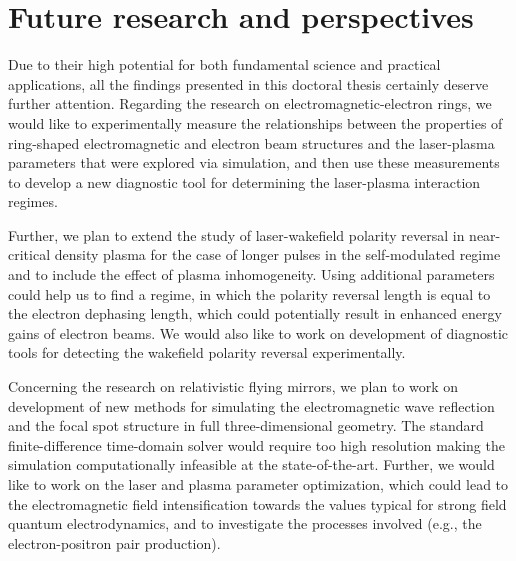 \documentclass[10pt, a4paper, twoside, openright]{report}
\newcommand{\q}[1]{``#1''} %
\begin{document}
\section{Future research and perspectives}

Due to their high potential for both fundamental science and practical applications, all the findings presented in this doctoral thesis certainly deserve further attention. Regarding the research on electromagnetic-electron rings, we would like to experimentally measure the relationships between the properties of ring-shaped electromagnetic and electron beam structures and the laser-plasma parameters that were explored via simulation, and then use these measurements to develop a new diagnostic tool for determining the laser-plasma interaction regimes. 

Further, we plan to extend the study of laser-wakefield polarity reversal in near-critical density plasma for the case of longer pulses in the self-modulated regime and to include the effect of plasma inhomogeneity. Using additional parameters could help us to find a regime, in which the polarity reversal length is equal to the electron dephasing length, which could potentially result in enhanced energy gains of electron beams. We would also like to work on development of diagnostic tools for detecting the wakefield polarity reversal experimentally.

Concerning the research on relativistic flying mirrors, we plan to work on development of new methods for simulating the electromagnetic wave reflection and the focal spot structure in full three-dimensional geometry. The standard finite-difference time-domain solver would require too high resolution making the simulation computationally infeasible at the state-of-the-art. Further, we would like to work on the laser and plasma parameter optimization, which could lead to the electromagnetic field intensification towards the values typical for strong field quantum electrodynamics, and to investigate the processes involved (e.g., the electron-positron pair production).


\end{document}

